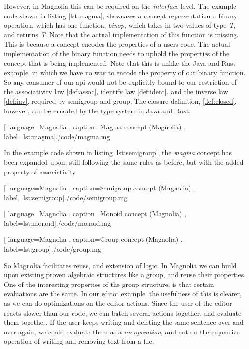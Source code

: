 However, in Magnolia this can be required on the \textit{interface}-level. The
example code shown in listing \ref{lst:magma}, showcases a concept
representation a binary operation, which has one function, \textit{binop}, which
takes in two values of type \textit{T}, and returns \textit{T}. Note that the
actual implementation of this function is missing. This is because a concept
encodes the properties of a users code. The actual implementation of the
binary function needs to uphold the properties of the concept that is
being implemented. Note that this is unlike the Java and Rust example, in
which we have no way to encode the property of our binary function. So any
consumer of our \gls*{api} would not be explicitly bound to our restriction of
the associativity law \ref{def:assoc}, identify law \ref{def:ident}, and the
inverse law \ref{def:inv}, required by semigroup and group. The closure
definition, \ref{def:closed}, however, can be encoded by the type system in Java
and Rust.

\begin{center}
  
    [ language=Magnolia
    , caption={Magma concept (Magnolia)}
    , label=lst:magma]{./code/magma.mg}
\end{center}

In the example code shown in listing \ref{lst:semigroup}, the \textit{magma}
concept has been expanded upon, still following the same rules as before, but
with the added property of associativity.

\begin{center}
  
    [ language=Magnolia
    , caption={Semigroup concept (Magnolia)}
    , label=lst:semigroup]{./code/semigroup.mg}
\end{center}

\begin{center}
  
    [ language=Magnolia
    , caption={Monoid concept (Magnolia)}
    , label=lst:monoid]{./code/monoid.mg}
\end{center}

\begin{center}
  
    [ language=Magnolia
    , caption={Group concept (Magnolia)}
    , label=lst:group]{./code/group.mg}
\end{center}

So Magnolia facilitates reuse, and extension of logic. In Magnolia we can build
upon existing proven algebraic structures like a group, and reuse their
properties. One of the interesting properties of the group structure, is that
certain evaluations are the same. In our editor example, the usefulness of this
is clearer, as we can do optimizations on the editor actions. Since the user of
the editor reacts slower than our code, we can batch several actions together,
and evaluate them together. If the user keeps writing and deleting the same
sentence over and over again, we could evaluate them as a
\textit{no-operation}, and not do the expensive operation of writing and
removing text from a file.



